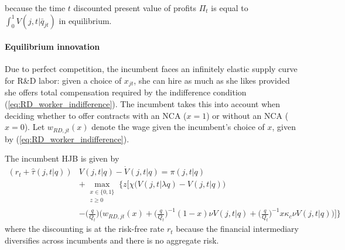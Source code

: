 \documentclass[11pt,english]{article}
\begin{document}
because the time $t$ discounted present value of profits $\Pi_t$ is equal to $\int_0^1 V(j,t | \bar{q}_{jt})$ in equilibrium.

\paragraph{Equilibrium innovation}

Due to perfect competition, the incumbent faces an infinitely elastic supply curve for R\&D labor: given a choice of $x_{jt}$, she can hire as much as she likes provided she offers total compensation required by the indifference condition (\ref{eq:RD_worker_indifference}). The incumbent takes this into account when deciding whether to offer contracts with an NCA ($x = 1$) or without an NCA ($x = 0$). Let $w_{RD,jt}(x)$ denote the  wage given the incumbent's choice of $x$, given by (\ref{eq:RD_worker_indifference}).

The incumbent HJB is given by 
\begin{align}
(r_t + \hat{\tau}(j,t|q)) &V(j,t |q) - \dot{V}(j,t|q) = \pi(j,t|q) \nonumber \\_{}
&+ \max_{\substack{x \in \{0,1\} \\ z \ge 0}} \Bigg\{ z \Big[ \chi \big( V(j,t|\lambda q) - V(j,t|q)\big)  \nonumber \\
&- \big(\frac{q}{Q_t}\big) \Big( w_{RD,jt}(x) + \big(\frac{q}{Q_t}\big)^{-1} (1-x) \nu V(j,t|q) + \big(\frac{q}{Q_t}\big)^{-1}  x \kappa_c \nu V(j,t|q) \Big)  \Big] \Bigg\} \label{eq:hjb_incumbent_0}
\end{align}
where the discounting is at the risk-free rate $r_t$ because the financial intermediary diversifies across incumbents and there is no aggregate risk.
\end{document}
